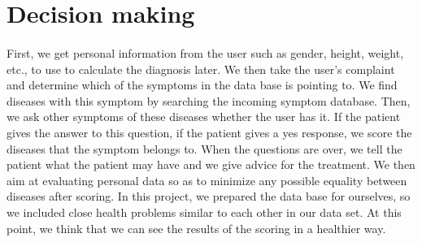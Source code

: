 \section{Decision making}

\paragraph{}
First,	we	get	personal	information	from	the	user	such	as	gender,	height,	weight,	etc.,	to	use	to	calculate	the	diagnosis	later.	We	then	take	the	user's	complaint	and	determine	which	of	the	symptoms	in	the	data	base	is	pointing	to.	We	find	diseases	with	this	symptom	by	searching	the	incoming	symptom	database.	Then,	we	ask	other	symptoms	of	these	diseases	whether	the	user	has	it.	If	the	patient	gives	the	answer	to	this	question,	if	the	patient	gives	a	yes	response,	we	score	the	diseases	that	the	symptom	belongs	to.	When	the	questions	are	over,	we	tell	the	patient	what	the	patient	may	have	and	we	give	advice	for	the	treatment.	We	then	aim	at	evaluating	personal	data	so	as	to	minimize	any	possible	equality	between	diseases	after	scoring.	In	this	project,	we	prepared	the	data	base	for	ourselves,	so	we	included	close	health	problems	similar	to	each	other	in	our	data	set.	At	this	point,	we	think	that	we	can	see	the	results	of	the	scoring	in	a	healthier	way.	